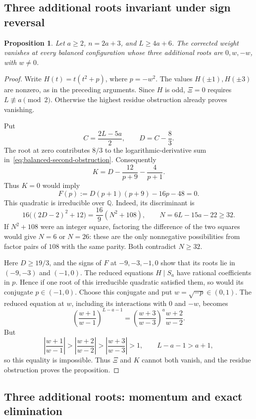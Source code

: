 \documentclass[11pt]{article}
\newtheorem{proposition}{Proposition}[section]
\theoremstyle{definition}
\begin{document}
\subsection{Three additional roots invariant under sign reversal}

\begin{proposition}\label{prop:balanced-three-symmetric-roots}
Let $a\ge2$, $n=2a+3$, and $L\ge4a+6$. The corrected weight
vanishes at every balanced configuration whose three additional roots
are $0,w,-w$, with $w\ne0$.
\end{proposition}

\begin{proof}
Write $H(t)=t(t^2+p)$, where $p=-w^2$. The values
$H(\pm1),H(\pm3)$ are nonzero, as in the preceding arguments.
Since $H$ is odd, $\Xi=0$ requires $L\not\equiv a\pmod2$.
Otherwise the highest residue obstruction already proves vanishing.

Put
\[
 C=\frac{2L-5a}{2},\qquad D=C-\frac83.
\]
The root at zero contributes $8/3$ to the logarithmic-derivative
sum in~\eqref{eq:balanced-second-obstruction}. Consequently
\[
 K=D-\frac{12}{p+9}-\frac4{p+1}.
\]
Thus $K=0$ would imply
\[
 F(p):=D(p+1)(p+9)-16p-48=0.
\]
This quadratic is irreducible over $\mathbb Q$. Indeed, its
discriminant is
\[
 16\bigl((2D-2)^2+12\bigr)
 =\frac{16}{9}(N^2+108),\qquad N=6L-15a-22\ge32.
\]
If $N^2+108$ were an integer square, factoring the difference of
the two squares would give $N=6$ or $N=26$: these are the only
nonnegative possibilities from factor pairs of $108$ with the same
parity. Both contradict $N\ge32$.

Here $D\ge19/3$, and the signs of $F$ at $-9,-3,-1,0$
show that its roots lie in $(-9,-3)$ and $(-1,0)$.
The reduced equations $H\mid S_a$ have rational coefficients in
$p$. Hence if one root of this irreducible quadratic satisfied them,
so would its conjugate $p\in(-1,0)$. Choose this conjugate and put
$w=\sqrt{-p}\in(0,1)$. The reduced equation at $w$, including its
interactions with $0$ and $-w$, becomes
\[
 \left(\frac{w+1}{w-1}\right)^{L-a-1}
 =\left(\frac{w+3}{w-3}\right)^a\frac{w+2}{w-2}.
\]
But
\[
 \left|\frac{w+1}{w-1}\right|
 >\left|\frac{w+2}{w-2}\right|
 >\left|\frac{w+3}{w-3}\right|>1,
 \qquad L-a-1>a+1,
\]
so this equality is impossible. Thus $\Xi$ and $K$ cannot both
vanish, and the residue obstruction proves the proposition.
\end{proof}

\subsection{Three additional roots: momentum and exact elimination}
\end{document}
